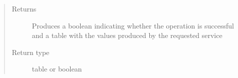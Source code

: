 \documentclass[a4paper,10pt,english,openany,oneside]{sphinxmanual}
\begin{document}
\begin{fulllineitems}
\begin{fulllineitems}
\begin{quote}
\begin{description}
\item[{Returns}] \leavevmode
Produces a boolean indicating whether the operation is successful and a table with the values ​​produced by the requested service

\item[{Return type}] \leavevmode
table or boolean

\end{description}\end{quote}

\end{fulllineitems}


\end{fulllineitems}




\renewcommand{\indexname}{Index}
\printindex
\end{document}
